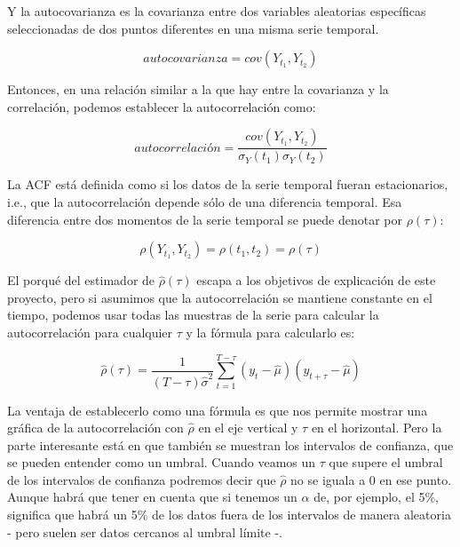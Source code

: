Y la autocovarianza es la covarianza entre dos variables aleatorias específicas seleccionadas de dos puntos diferentes en una misma serie temporal. 

\begin{equation}
	autocovarianza = cov(Y_{t_{1}}, Y_{t_{2}})
\end{equation}

Entonces, en una relación similar a la que hay entre la covarianza y la correlación, podemos establecer la autocorrelación como:

\begin{equation}
	autocorrelación = \frac{cov(Y_{t_{1}}, Y_{t_{2}})}{\sigma_{Y}(t_{1})\sigma_{Y}(t_{2})}
\end{equation}

La ACF está definida como si los datos de la serie temporal fueran estacionarios, i.e., que la autocorrelación depende sólo de una diferencia temporal. Esa diferencia entre dos momentos de la serie temporal se puede denotar por $\rho(\tau)$:

\begin{equation}
	\rho(Y_{t_{1}}, Y_{t_{2}}) = \rho(t_{1}, t_{2}) = \rho(\tau)
\end{equation}

El porqué del estimador de $\hat{\rho}(\tau)$ escapa a los objetivos de explicación de este proyecto, pero si asumimos que la autocorrelación se mantiene constante en el tiempo, podemos usar todas las muestras de la serie para calcular la autocorrelación para cualquier $\tau$ y la fórmula para calcularlo es:

\begin{equation}
	\hat{\rho}(\tau) = \frac{1}{(T-\tau)\hat{\sigma}^{2}} \sum_{t=1}^{T-\tau} (y_{t}-\hat{\mu})(y_{t+\tau}-\hat{\mu})
\end{equation}

La ventaja de establecerlo como una fórmula es que nos permite mostrar una gráfica de la autocorrelación con $\hat{\rho}$ en el eje vertical y $\tau$ en el horizontal. Pero la parte interesante está en que también se muestran los intervalos de confianza, que se pueden entender como un umbral. Cuando veamos un $\tau$ que supere el umbral de los intervalos de confianza podremos decir que $\hat{\rho}$ no se iguala a 0 en ese punto. Aunque habrá que tener en cuenta que si tenemos un $\alpha$ de, por ejemplo, el 5\%, significa que habrá un 5\% de los datos fuera de los intervalos de manera aleatoria - pero suelen ser datos cercanos al umbral límite -. 

